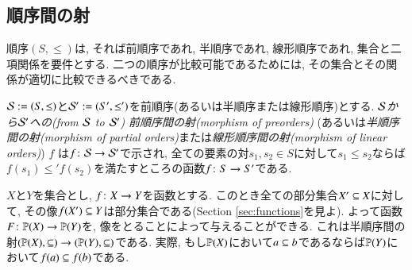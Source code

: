 
\subsection{順序間の射}


順序$(S,\leq)$は, それば前順序であれ, 半順序であれ, 線形順序であれ, 集合と二項関係を要件とする. 二つの順序が比較可能であるためには, その集合とその関係が適切に比較できるべきである.

\begin{definition}\label{def:morphism of orders}


$\mcS:=(S,\leq)$と$\mcS':=(S',\leq')$を前順序(あるいは半順序または線形順序)とする. \emph{$\mcS$から$\mcS'$への(from $\mcS$ to $\mcS'$)}
\emph{前順序間の射(morphism of preorders)} (あるいは\emph{半順序間の射(morphism of partial orders)}または\emph{線形順序間の射(morphism of linear orders)}) $f$ は$f\taking\mcS\to\mcS'$で示され, 全ての要素の対$s_1,s_2\in S$に対して$s_1\leq s_2$ならば$f(s_1)\leq' f(s_2)$を満たすところの函数$f\taking S\to S'$である.
\end{definition}

\begin{example}


$X$と$Y$を集合とし, $f\taking X\to Y$を函数とする. このとき全ての部分集合$X'\ss X$に対して, その像$f(X')\ss Y$は部分集合である(Section \ref{sec:functions}を見よ). よって函数$F\taking\PP(X)\to\PP(Y)$を, 像をとることによって与えることができる. これは半順序間の射$(\PP(X),\ss)\to(\PP(Y),\ss)$である. 実際, もし$\PP(X)$において$a\ss b$であるならば$\PP(Y)$において$f(a)\ss f(b)$である.

\end{example}

